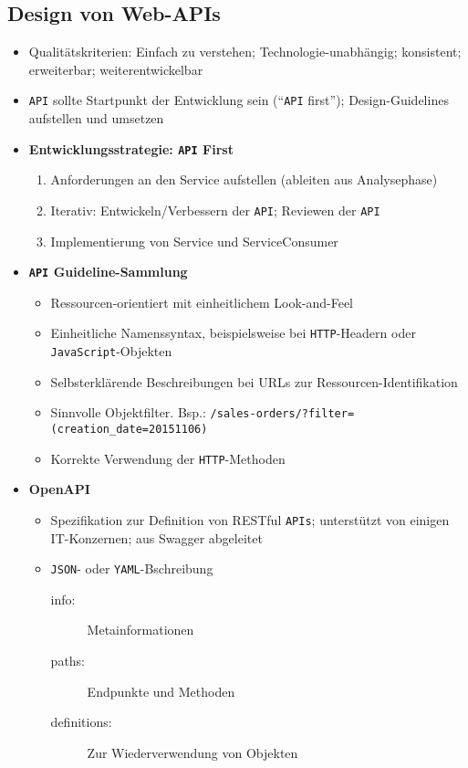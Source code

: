 \subsection{Design von Web-APIs}
\begin{itemize}
	\item Qualitätskriterien: Einfach zu verstehen; Technologie-unabhängig; konsistent; erweiterbar; weiterentwickelbar
	\item \texttt{API} sollte Startpunkt der Entwicklung sein ("`\texttt{API} first"'); Design-Guidelines aufstellen und umsetzen
	\item \textbf{Entwicklungsstrategie: \texttt{API} First}
	\begin{enumerate}
		\item Anforderungen an den Service aufstellen (ableiten aus Analysephase)
		\item Iterativ: Entwickeln/Verbessern der \texttt{API}; Reviewen der \texttt{API}
		\item Implementierung von Service und ServiceConsumer
	\end{enumerate}
	\item \textbf{\texttt{API} Guideline-Sammlung}
	\begin{itemize}
		\item Ressourcen-orientiert mit einheitlichem Look-and-Feel
		\item Einheitliche Namenssyntax, beispielsweise bei \texttt{HTTP}-Headern oder \texttt{JavaScript}-Objekten
		\item Selbsterklärende Beschreibungen bei URLs zur Ressourcen-Identifikation
		\item Sinnvolle Objektfilter. Bsp.: \texttt{/sales-orders/?filter=(creation\_date=20151106)}
		\item Korrekte Verwendung der \texttt{HTTP}-Methoden
	\end{itemize}
	\item \textbf{OpenAPI}
	\begin{itemize}
		\item Spezifikation zur Definition von RESTful \texttt{APIs}; unterstützt von einigen IT-Konzernen; aus Swagger abgeleitet
		\item \texttt{JSON}- oder \texttt{YAML}-Bschreibung
		\begin{description}
			\item[info:] Metainformationen
			\item[paths:] Endpunkte und Methoden
			\item[definitions:] Zur Wiederverwendung von Objekten

\end{description}
\end{itemize}
\end{itemize}
